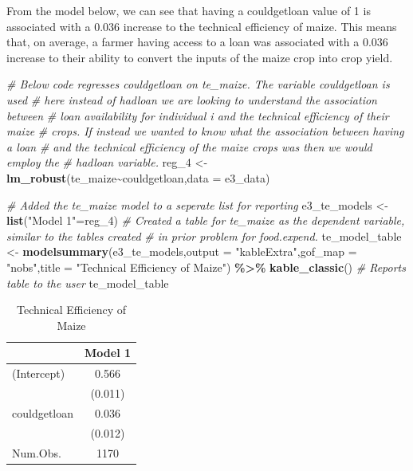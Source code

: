 \documentclass[
]{article}
\newenvironment{Shaded}{\begin{snugshade}}{\end{snugshade}}
\newcommand{\AttributeTok}[1]{\textcolor[rgb]{0.13,0.29,0.53}{#1}}
\newcommand{\CommentTok}[1]{\textcolor[rgb]{0.56,0.35,0.01}{\textit{#1}}}
\newcommand{\FunctionTok}[1]{\textcolor[rgb]{0.13,0.29,0.53}{\textbf{#1}}}
\newcommand{\NormalTok}[1]{#1}
\newcommand{\OtherTok}[1]{\textcolor[rgb]{0.56,0.35,0.01}{#1}}
\newcommand{\SpecialCharTok}[1]{\textcolor[rgb]{0.81,0.36,0.00}{\textbf{#1}}}
\newcommand{\StringTok}[1]{\textcolor[rgb]{0.31,0.60,0.02}{#1}}
\begin{document}
From the model below, we can see that having a couldgetloan value of 1
is associated with a 0.036 increase to the technical efficiency of
maize. This means that, on average, a farmer having access to a loan was
associated with a 0.036 increase to their ability to convert the inputs
of the maize crop into crop yield.\\

\begin{Shaded}
\begin{Highlighting}[]
\CommentTok{\# Below code regresses couldgetloan on te\_maize. The variable couldgetloan is used}
\CommentTok{\# here instead of hadloan we are looking to understand the association between }
\CommentTok{\# loan availability for individual i and the technical efficiency of their maize}
\CommentTok{\# crops. If instead we wanted to know what the association between having a loan}
\CommentTok{\# and the technical efficiency of the maize crops was then we would employ the}
\CommentTok{\# hadloan variable. }
\NormalTok{reg\_4 }\OtherTok{\textless{}{-}} \FunctionTok{lm\_robust}\NormalTok{(te\_maize}\SpecialCharTok{\textasciitilde{}}\NormalTok{couldgetloan,}\AttributeTok{data =}\NormalTok{ e3\_data)}

\CommentTok{\# Added the te\_maize model to a seperate list for reporting}
\NormalTok{e3\_te\_models }\OtherTok{\textless{}{-}} \FunctionTok{list}\NormalTok{(}\StringTok{"Model 1"}\OtherTok{=}\NormalTok{reg\_4)}
\CommentTok{\# Created a table for te\_maize as the dependent variable, similar to the tables created}
\CommentTok{\# in prior problem for food.expend. }
\NormalTok{te\_model\_table }\OtherTok{\textless{}{-}} \FunctionTok{modelsummary}\NormalTok{(e3\_te\_models,}\AttributeTok{output =} \StringTok{"kableExtra"}\NormalTok{,}\AttributeTok{gof\_map =} \StringTok{"nobs"}\NormalTok{,}\AttributeTok{title =} \StringTok{"Technical Efficiency of Maize"}\NormalTok{) }\SpecialCharTok{\%\textgreater{}\%} \FunctionTok{kable\_classic}\NormalTok{()}
\CommentTok{\# Reports table to the user}
\NormalTok{te\_model\_table}
\end{Highlighting}
\end{Shaded}

\begin{table}

\caption{\label{tab:unnamed-chunk-7}Technical Efficiency of Maize}
\centering
\begin{tabular}[t]{lc}
\toprule
  & Model 1\\
\midrule
(Intercept) & \num{0.566}\\
 & (\num{0.011})\\
couldgetloan & \num{0.036}\\
 & (\num{0.012})\\
\midrule
Num.Obs. & \num{1170}\\
\bottomrule
\end{tabular}
\end{table}
\end{document}

